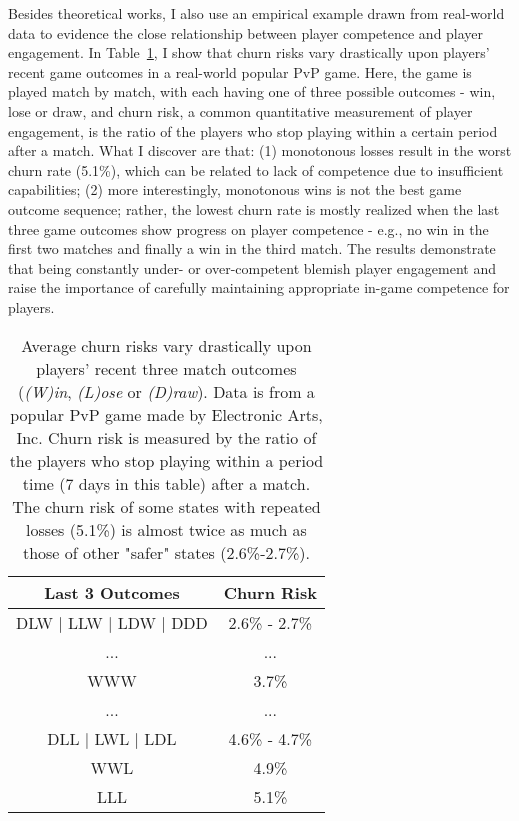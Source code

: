 

Besides theoretical works, I also use an empirical example drawn from real-world data to evidence the close relationship between player competence and player engagement. In Table~\ref{tab:churnrate}, I show that churn risks vary drastically upon players' recent game outcomes in a real-world popular PvP game. Here, the game is played match by match, with each having one of three possible outcomes - win, lose or draw, and churn risk, a common quantitative measurement of player engagement, is the ratio of the players who stop playing within a certain period after a match. What I discover are that: (1) monotonous losses result in the worst churn rate (5.1\%), which can be related to lack of competence due to insufficient capabilities; (2) more interestingly, monotonous wins is not the best game outcome sequence; rather, the lowest churn rate is mostly realized when the last three game outcomes show progress on player competence - e.g., no win in the first two matches and finally a win in the third match. The results demonstrate that being constantly under- or over-competent blemish player engagement and raise the importance of carefully maintaining appropriate in-game competence for players.               

\begin{table}
\centering
\caption{
Average churn risks vary drastically upon players' recent three match outcomes (\emph{(W)in}, \emph{(L)ose} or \emph{(D)raw}). Data is from a popular PvP game made by Electronic Arts, Inc. Churn risk is measured by the ratio of the players who stop playing within a period time (7 days in this table) after a match. The churn risk of some states with repeated losses (5.1\%) is almost twice as much as those of other "safer" states (2.6\%-2.7\%).
} \label{tab:churnrate}
\vspace{2mm}
\begin{tabular}{|c|c|}
\hline
Last 3 Outcomes & Churn Risk                      \\ \hline
DLW $|$ LLW $|$ LDW $|$ DDD      &  2.6\% - 2.7\%        \\
... & ...  \\
WWW   &  3.7\% \\
... & ... \\
DLL $|$ LWL $|$ LDL  &  4.6\% - 4.7\%  \\
WWL & 4.9\% \\
LLL & 5.1\% \\
\hline
\end{tabular}
\end{table}

